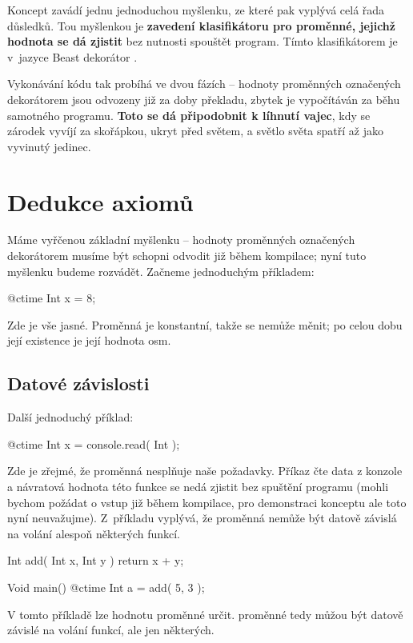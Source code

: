 Koncept zavádí jednu jednoduchou myšlenku, ze které pak vyplývá celá řada důsledků. Tou myšlenkou je \textbf{zavedení klasifikátoru pro proměnné, jejichž hodnota se dá zjistit} bez nutnosti spouštět program. Tímto klasifikátorem je v~jazyce Beast dekorátor \ctime.

Vykonávání kódu tak probíhá ve dvou fázích -- hodnoty proměnných označených dekorátorem \ctime jsou odvozeny již za doby překladu, zbytek je vypočítáván za běhu samotného programu. \textbf{Toto se dá připodobnit k líhnutí vajec}, kdy se zárodek vyvíjí za skořápkou, ukryt před světem, a světlo světa spatří až jako vyvinutý jedinec.

\section{Dedukce axiomů}
Máme vyřčenou základní myšlenku -- hodnoty proměnných označených dekorátorem \ctime musíme být schopni odvodit již během kompilace; nyní tuto myšlenku budeme rozvádět. Začneme jednoduchým příkladem:
\begin{code}
@ctime Int x = 8;
\end{code}

Zde je vše jasné. Proměnná je konstantní, takže se nemůže měnit; po celou dobu její existence je její hodnota osm.

\subsection{Datové závislosti} \label{ctimeDataDependency}
Další jednoduchý příklad:
\begin{code}
@ctime Int x = console.read( Int );
\end{code}

Zde je zřejmé, že proměnná  nesplňuje naše požadavky. Příkaz  čte data z konzole a návratová hodnota této funkce se nedá zjistit bez spuštění programu (mohli bychom požádat o vstup již během kompilace, pro demonstraci konceptu ale toto nyní neuvažujme). Z~příkladu vyplývá, že \ctime proměnná nemůže být datově závislá na volání alespoň některých funkcí.

\begin{code}
Int add( Int x, Int y ) {
	return x + y;
}

Void main() {
	@ctime Int a = add( 5, 3 );
}
\end{code}
V tomto příkladě lze hodnotu proměnné  určit. \ctime proměnné tedy můžou být datově závislé na volání funkcí, ale jen některých.

